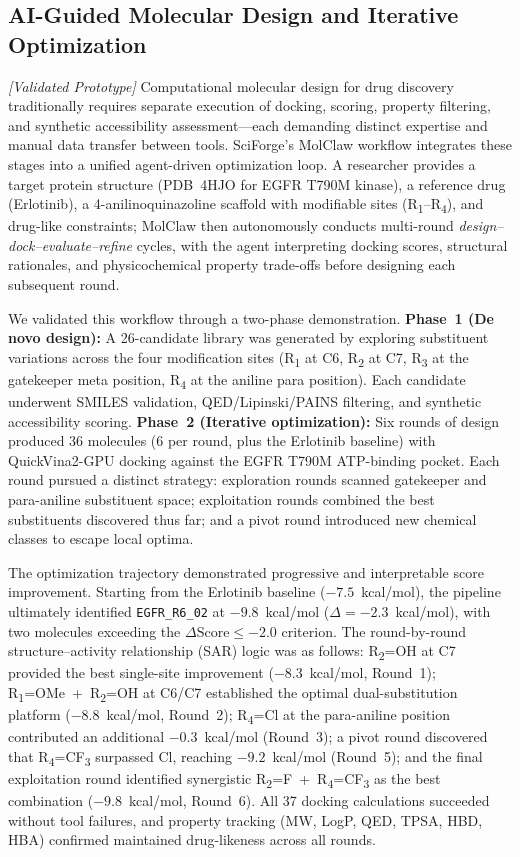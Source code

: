\documentclass[sn-basic,Numbered,pdflatex]{sn-jnl}
\begin{document}
\subsection{AI-Guided Molecular Design and Iterative Optimization}

\textit{[Validated Prototype]} Computational molecular design for drug discovery traditionally requires separate execution of docking, scoring, property filtering, and synthetic accessibility assessment---each demanding distinct expertise and manual data transfer between tools. SciForge's MolClaw workflow integrates these stages into a unified agent-driven optimization loop. A researcher provides a target protein structure (PDB~4HJO for EGFR T790M kinase), a reference drug (Erlotinib), a 4-anilinoquinazoline scaffold with modifiable sites (R\textsubscript{1}--R\textsubscript{4}), and drug-like constraints; MolClaw then autonomously conducts multi-round \emph{design--dock--evaluate--refine} cycles, with the agent interpreting docking scores, structural rationales, and physicochemical property trade-offs before designing each subsequent round.

We validated this workflow through a two-phase demonstration. \textbf{Phase~1 (De novo design):} A 26-candidate library was generated by exploring substituent variations across the four modification sites (R\textsubscript{1} at C6, R\textsubscript{2} at C7, R\textsubscript{3} at the gatekeeper meta position, R\textsubscript{4} at the aniline para position). Each candidate underwent SMILES validation, QED/Lipinski/PAINS filtering, and synthetic accessibility scoring. \textbf{Phase~2 (Iterative optimization):} Six rounds of design produced 36 molecules (6 per round, plus the Erlotinib baseline) with QuickVina2-GPU docking against the EGFR T790M ATP-binding pocket. Each round pursued a distinct strategy: exploration rounds scanned gatekeeper and para-aniline substituent space; exploitation rounds combined the best substituents discovered thus far; and a pivot round introduced new chemical classes to escape local optima.

The optimization trajectory demonstrated progressive and interpretable score improvement. Starting from the Erlotinib baseline ($-7.5$~kcal/mol), the pipeline ultimately identified \texttt{EGFR\_R6\_02} at $-9.8$~kcal/mol ($\Delta = -2.3$~kcal/mol), with two molecules exceeding the $\Delta\text{Score} \leq -2.0$ criterion. The round-by-round structure--activity relationship (SAR) logic was as follows: R\textsubscript{2}=OH at C7 provided the best single-site improvement ($-8.3$~kcal/mol, Round~1); R\textsubscript{1}=OMe~+~R\textsubscript{2}=OH at C6/C7 established the optimal dual-substitution platform ($-8.8$~kcal/mol, Round~2); R\textsubscript{4}=Cl at the para-aniline position contributed an additional $-0.3$~kcal/mol (Round~3); a pivot round discovered that R\textsubscript{4}=CF\textsubscript{3} surpassed Cl, reaching $-9.2$~kcal/mol (Round~5); and the final exploitation round identified synergistic R\textsubscript{2}=F~+~R\textsubscript{4}=CF\textsubscript{3} as the best combination ($-9.8$~kcal/mol, Round~6). All 37 docking calculations succeeded without tool failures, and property tracking (MW, LogP, QED, TPSA, HBD, HBA) confirmed maintained drug-likeness across all rounds.
\end{document}
